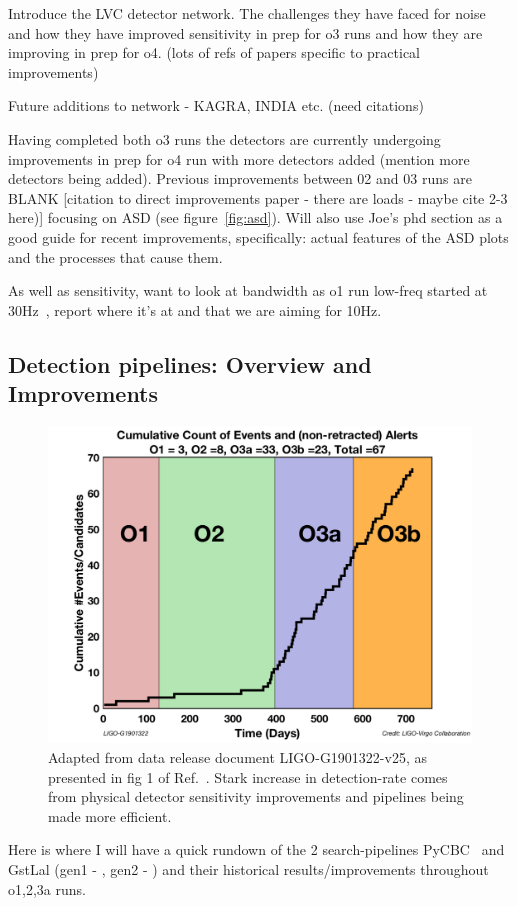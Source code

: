 \documentclass[11pt]{article}
\begin{document}
Introduce the LVC detector network. The challenges they have faced for noise and how they have improved sensitivity in prep for o3 runs and how they are improving in prep for o4. (lots of refs of papers specific to practical improvements)

Future additions to network - KAGRA, INDIA etc. (need citations)

Having completed both o3 runs the detectors are currently undergoing improvements in prep for o4 run with more detectors added (mention more detectors being added). Previous improvements between 02 and 03 runs are BLANK [citation to direct improvements paper - there are loads - maybe cite 2-3 here)] focusing on ASD (see figure~\ref{fig:asd}). Will also use Joe's phd section as a good guide for recent improvements, specifically: actual features of the ASD plots and the processes that cause them.

As well as sensitivity, want to look at bandwidth as o1 run low-freq started at 30Hz~\cite{BBHo1}, report where it's at and that we are aiming for 10Hz. 

\subsection{Detection pipelines: Overview and Improvements}

\begin{figure}[t!]
    \centering
    \includegraphics[width=.6\linewidth]{shared_resources/shared_figs/number_events.png}
    \caption{Adapted from data release document LIGO-G1901322-v25, as presented in fig 1 of Ref.~\cite{gwtc2}. Stark increase in detection-rate comes from physical detector sensitivity improvements and pipelines being made more efficient.}
    \label{fig:events}
\end{figure}


Here is where I will have a quick rundown of the 2 search-pipelines PyCBC~\cite{pycbc2016} and GstLal (gen1 - \cite{gstlal_gen1_2017}, gen2 - \cite{gstlal_gen2_2019}) and their historical results/improvements throughout o1,2,3a runs.
\end{document}
